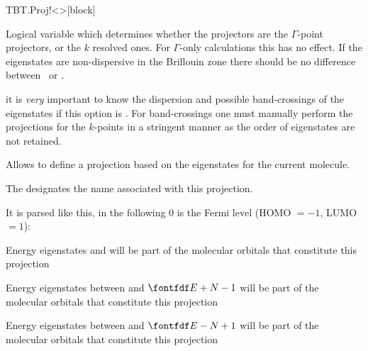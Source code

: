 \begin{fdfentry}{TBT.Proj!<>}[block]
\begin{fdfoptions}
\begin{fdfoptions}
    \end{fdfoptions}


    \option[Gamma]%
    
    Logical variable which determines whether the projectors are the
    $\Gamma$-point projectors, or the $k$ resolved ones. For
    $\Gamma$-only calculations this has no effect.
    If the eigenstates are non-dispersive in the Brillouin zone there
    should be no difference between \fdftrue\ or \fdffalse.


    \note it is \emph{very} important to know the dispersion and
    possible band-crossings of the eigenstates if this option is
    \fdffalse. For band-crossings one must manually perform the
    projections for the $k$-points in a stringent manner as the order
    of eigenstates are not retained.



    Allows to define a projection based on the eigenstates for the
    current molecule.

    The  designates the name associated with this
    projection.

    It is parsed like this, in the following $0$ is the Fermi level
    (HOMO $=-1$, LUMO $=1$):
    \begin{fdfoptions}

      Energy eigenstates  and  will be part of the
      molecular orbitals that constitute this projection

      Energy eigenstates between  and $\fdf*{E}+N-1$ will be
      part of the molecular orbitals that constitute this projection

      Energy eigenstates between  and $\fdf*{E}-N+1$ will be
      part of the molecular orbitals that constitute this projection


\end{fdfoptions}
\end{fdfoptions}
\end{fdfentry}
